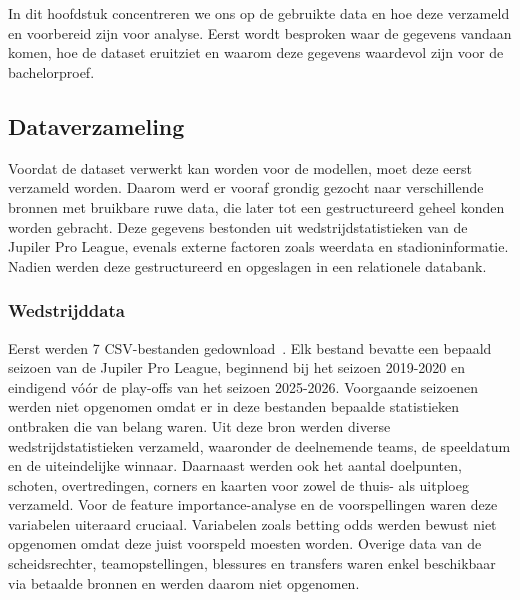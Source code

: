 \chapter{}%
\label{ch:dataverzameling}

In dit hoofdstuk concentreren we ons op de gebruikte data en hoe deze verzameld en voorbereid zijn voor analyse.
Eerst wordt besproken waar de gegevens vandaan komen, hoe de dataset eruitziet en waarom deze gegevens waardevol zijn voor de bachelorproef.

\section{Dataverzameling}

Voordat de dataset verwerkt kan worden voor de modellen, moet deze eerst verzameld worden.
Daarom werd er vooraf grondig gezocht naar verschillende bronnen met bruikbare ruwe data,
die later tot een gestructureerd geheel konden worden gebracht.
Deze gegevens bestonden uit wedstrijdstatistieken van de Jupiler Pro League,
evenals externe factoren zoals weerdata en stadioninformatie. Nadien werden deze gestructureerd en opgeslagen in een relationele databank.

\subsection{Wedstrijddata}

Eerst werden 7 CSV-bestanden gedownload~\autocite{football_data_belgium}.
Elk bestand bevatte een bepaald seizoen van de Jupiler Pro League, beginnend bij het seizoen 2019-2020 en eindigend vóór de play-offs van het seizoen 2025-2026.
Voorgaande seizoenen werden niet opgenomen omdat er in deze bestanden bepaalde statistieken ontbraken die van belang waren.
Uit deze bron werden diverse wedstrijdstatistieken verzameld,
waaronder de deelnemende teams, de speeldatum en de uiteindelijke winnaar.
Daarnaast werden ook het aantal doelpunten, schoten, overtredingen, corners en kaarten voor zowel de thuis- als uitploeg verzameld.
Voor de feature importance-analyse en de voorspellingen waren deze variabelen uiteraard cruciaal.
Variabelen zoals betting odds werden bewust niet opgenomen omdat deze juist voorspeld moesten worden.
Overige data van de scheidsrechter, teamopstellingen, blessures en transfers waren enkel beschikbaar via betaalde bronnen en werden daarom niet opgenomen.

